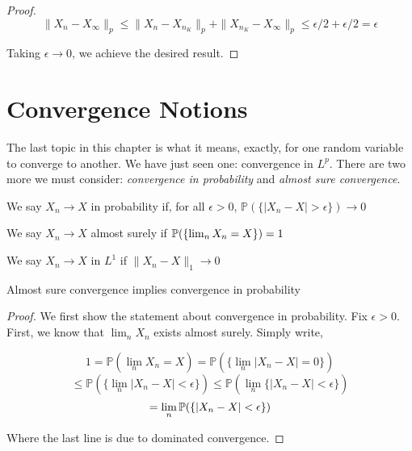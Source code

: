 \begin{proof}
        \[ \|X_n - X_\infty\|_p \leq \|X_n - X_{n_K}\|_p + \|X_{n_K} - X_\infty\|_p \leq \epsilon/2 + \epsilon/2 = \epsilon \]

        Taking $\epsilon \to 0$, we achieve the desired result.

    \end{proof}

    \section{Convergence Notions}

    The last topic in this chapter is what it means, exactly, for one random variable 
    to converge to another. We have just seen one: convergence in $L^p$. There are two 
    more we must consider: \emph{convergence in probability} and \emph{almost sure convergence}. 

    \begin{definition}
        We say $X_n \to X$ in probability if, for all $\epsilon > 0$, $\mathbb P(\{|X_n - X| > \epsilon\}) \to 0$
    \end{definition}

    \begin{definition}
        We say $X_n \to X$ almost surely if $\mathbb P(\{\lim_n X_n = X\}) = 1$
    \end{definition}

    \begin{definition}[Convergence in $L^1$]
        We say $X_n \to X$ in $L^1$ if $\|X_n - X\|_1 \to 0$
    \end{definition}

    \begin{Proposition} 
        Almost sure convergence implies convergence in probability
    \end{Proposition}

    \begin{proof}
        We first show the statement about convergence in probability. Fix $\epsilon > 0$. 
        First, we know that $\lim_n X_n$ exists almost surely. Simply write,

        \[ 1 = \mathbb P(\lim_n X_n = X) = \mathbb P(\{\lim_n |X_n - X| = 0\}) \]
        \[ \leq \mathbb P(\{\lim_n |X_n - X| < \epsilon \}) \leq \mathbb P(\lim_n\{ |X_n - X| < \epsilon \}) \]
        \[ = \lim_n \mathbb P(\{|X_n - X| < \epsilon\}) \]

        Where the last line is due to dominated convergence.
    \end{proof}

